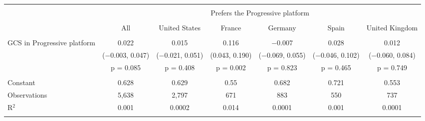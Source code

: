 
\begin{tabular}{@{\extracolsep{5pt}}lcccccc} 
\\[-1.8ex]\hline 
\hline \\[-1.8ex] 
 & \multicolumn{6}{c}{Prefers the Progressive platform} \\ 
\cline{2-7} 
\\[-1.8ex] & All & United States & France & Germany & Spain & United Kingdom \\ 
\hline \\[-1.8ex] 
 GCS in Progressive platform & 0.022 & 0.015 & 0.116 & $-$0.007 & 0.028 & 0.012 \\ 
  & ($-$0.003, 0.047) & ($-$0.021, 0.051) & (0.043, 0.190) & ($-$0.069, 0.055) & ($-$0.046, 0.102) & ($-$0.060, 0.084) \\ 
  & p = 0.085 & p = 0.408 & p = 0.002 & p = 0.823 & p = 0.465 & p = 0.749 \\ 
 \hline \\[-1.8ex] 
Constant & 0.628 & 0.629 & 0.55 & 0.682 & 0.721 & 0.553 \\ 
Observations & 5,638 & 2,797 & 671 & 883 & 550 & 737 \\ 
R$^{2}$ & 0.001 & 0.0002 & 0.014 & 0.0001 & 0.001 & 0.0001 \\ 
\hline 
\hline \\[-1.8ex] 
\end{tabular} 